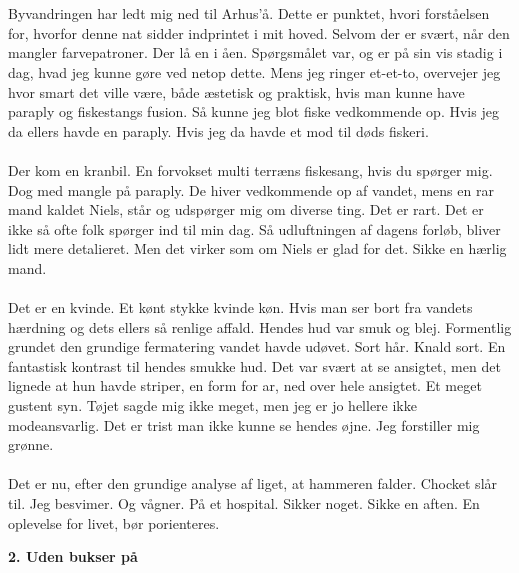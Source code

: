 \documentclass[]{article}
\begin{document}
\\ \\
Byvandringen har ledt mig ned til Arhus’å. Dette er punktet, hvori forståelsen for, hvorfor denne nat sidder indprintet i mit hoved. Selvom der er  svært, når den mangler farvepatroner. Der lå en i åen. Spørgsmålet var, og er på sin vis stadig i dag, hvad jeg kunne gøre ved netop dette. Mens jeg ringer et-et-to, overvejer jeg hvor smart det ville være, både æstetisk og praktisk, hvis man kunne have paraply og fiskestangs fusion. Så kunne jeg blot fiske vedkommende op. Hvis jeg da ellers havde en paraply. Hvis jeg da havde et mod til døds fiskeri.
\\ \\
Der kom en kranbil. En forvokset multi terræns fiskesang, hvis du spørger mig. Dog med mangle på paraply. De hiver vedkommende op af vandet, mens en rar mand kaldet Niels, står og udspørger mig om diverse ting. Det er rart. Det er ikke så ofte folk spørger ind til min dag. Så udluftningen af dagens forløb, bliver lidt mere detalieret. Men det virker som om Niels er glad for det. Sikke en hærlig mand.
\\ \\
Det er en kvinde. Et kønt stykke kvinde køn. Hvis man ser bort fra vandets hærdning og dets ellers så renlige affald. Hendes hud var smuk og blej. Formentlig grundet den grundige fermatering vandet havde udøvet. Sort hår. Knald sort. En fantastisk kontrast til hendes smukke hud. Det var svært at se ansigtet, men det lignede at hun havde striper, en form for ar, ned over hele ansigtet. Et meget gustent syn. Tøjet sagde mig ikke meget, men jeg er jo hellere ikke modeansvarlig. Det er trist man ikke kunne se hendes øjne. Jeg forstiller mig grønne.
\\ \\
Det er nu, efter den grundige analyse af liget, at hammeren falder. Chocket slår til. Jeg besvimer. Og vågner. På et hospital. Sikker noget. Sikke en aften. En oplevelse for livet, bør porienteres.

\begin{center}
	\large\textbf{2. Uden bukser på}
\end{center}
\end{document}
